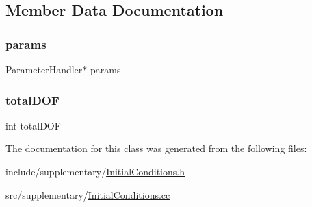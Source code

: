 \subsection{Member Data Documentation}
\mbox{\label{class_initial_conditions_a31d5e7a5228d9d55ba00fae854fcfaa0}} 
\subsubsection{\texorpdfstring{params}{params}}
{\footnotesize\ttfamily Parameter\+Handler$\ast$ params}

\mbox{\label{class_initial_conditions_acf5f14c806d215a0bf5c9f46d3e23607}} 
\subsubsection{\texorpdfstring{totalDOF}{totalDOF}}
{\footnotesize\ttfamily int total\+D\+OF}



The documentation for this class was generated from the following files\+:\begin{DoxyCompactItemize}
\item 
include/supplementary/\mbox{\hyperlink{_initial_conditions_8h}{Initial\+Conditions.\+h}}\item 
src/supplementary/\mbox{\hyperlink{_initial_conditions_8cc}{Initial\+Conditions.\+cc}}\end{DoxyCompactItemize}
